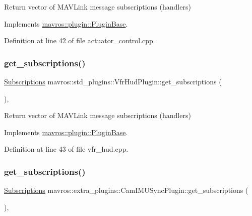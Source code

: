 Return vector of M\+A\+V\+Link message subscriptions (handlers) 



Implements \mbox{\hyperlink{group__plugin_gaf4e23fec6d7436a62cbf0942a2e5791c}{mavros\+::plugin\+::\+Plugin\+Base}}.



Definition at line 42 of file actuator\+\_\+control.\+cpp.

\mbox{\label{group__plugin_ga432994278dd02aa09f57ab7dc93fa109}} 
\subsubsection{\texorpdfstring{get\_subscriptions()}{get\_subscriptions()}\hspace{0.1cm}{\footnotesize\ttfamily [5/41]}}
{\footnotesize\ttfamily \mbox{\hyperlink{group__plugin_ga8967d61fc77040e0c3ea5a4585d62a09}{Subscriptions}} mavros\+::std\+\_\+plugins\+::\+Vfr\+Hud\+Plugin\+::get\+\_\+subscriptions (\begin{DoxyParamCaption}{ }\end{DoxyParamCaption})\hspace{0.3cm}{\ttfamily [inline]}, {\ttfamily [virtual]}}



Return vector of M\+A\+V\+Link message subscriptions (handlers) 



Implements \mbox{\hyperlink{group__plugin_gaf4e23fec6d7436a62cbf0942a2e5791c}{mavros\+::plugin\+::\+Plugin\+Base}}.



Definition at line 43 of file vfr\+\_\+hud.\+cpp.

\mbox{\label{group__plugin_gad1579267289ff44ce0ddcb795e480663}} 
\subsubsection{\texorpdfstring{get\_subscriptions()}{get\_subscriptions()}\hspace{0.1cm}{\footnotesize\ttfamily [6/41]}}
{\footnotesize\ttfamily \mbox{\hyperlink{group__plugin_ga8967d61fc77040e0c3ea5a4585d62a09}{Subscriptions}} mavros\+::extra\+\_\+plugins\+::\+Cam\+I\+M\+U\+Sync\+Plugin\+::get\+\_\+subscriptions (\begin{DoxyParamCaption}{ }\end{DoxyParamCaption})\hspace{0.3cm}{\ttfamily [inline]}, {\ttfamily [virtual]}}



